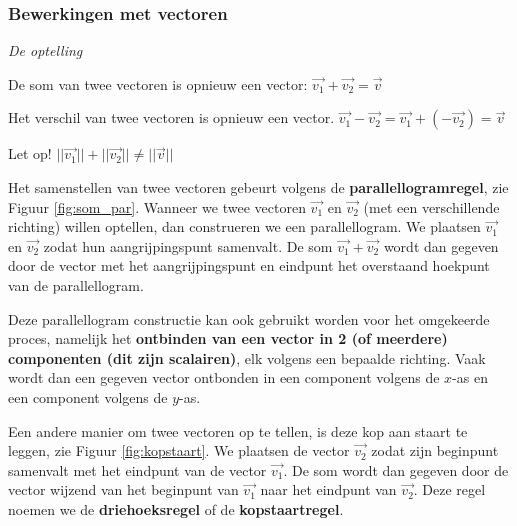 \subsubsection{Bewerkingen met vectoren}

\emph{De optelling}

\begin{definitie}
De som van twee vectoren is opnieuw een vector: $\vec{v_1}+\vec{v_2}=\vec{v}$

Het verschil van twee vectoren is opnieuw een vector. $\vec{v_1}-\vec{v_2}=\vec{v_1}+(-\vec{v_2})=\vec{v}$
\end{definitie}

\begin{opmerking}
	Let op! $||\vec{v_1}||+||\vec{v_2}|| \ne ||\vec{v}||$
\end{opmerking}

Het samenstellen van twee vectoren gebeurt volgens de \textbf{parallellogramregel}, zie Figuur \ref{fig:som_par}. Wanneer we twee vectoren $\vec{v_1}$ en $\vec{v_2}$ (met een verschillende richting) willen optellen, dan construeren we een parallellogram. We plaatsen $\vec{v_1}$ en $\vec{v_2}$ zodat hun aangrijpingspunt samenvalt. De som $\vec{v_1}+\vec{v_2}$ wordt dan gegeven door de vector met het aangrijpingspunt en eindpunt het overstaand hoekpunt van de parallellogram.


Deze parallellogram constructie kan ook gebruikt worden voor het omgekeerde proces, namelijk het \textbf{ontbinden van een vector in 2 (of meerdere) componenten (dit zijn scalairen)}, elk volgens een bepaalde richting. Vaak wordt dan een gegeven vector ontbonden in een component volgens de $x$-as en een component volgens de $y$-as.


Een andere manier om twee vectoren op te tellen, is deze kop aan staart te leggen, zie Figuur \ref{fig:kopstaart}. We plaatsen de vector $\vec{v_2}$ zodat zijn beginpunt samenvalt met het eindpunt van de vector $\vec{v_1}$. De som  wordt dan gegeven door de vector wijzend van het beginpunt van $\vec{v_1}$ naar het eindpunt van $\vec{v_2}$. Deze regel noemen we de \textbf{driehoeksregel} of de \textbf{kopstaartregel}.

